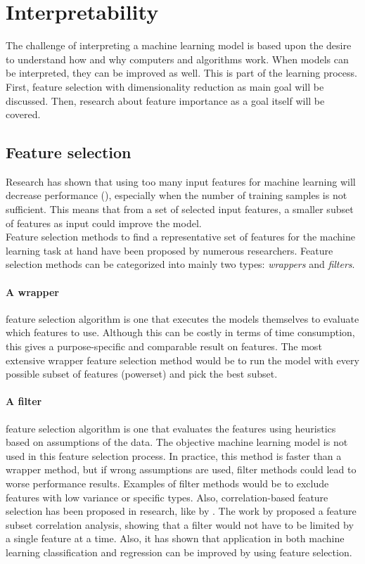 \section{Interpretability}
The challenge of interpreting a machine learning model is based upon the desire to understand how and why computers and algorithms work. When models can be interpreted, they can be improved as well. This is part of the learning process. First, feature selection with dimensionality reduction as main goal will be discussed. Then, research about feature importance as a goal itself will be covered.

\subsection{Feature selection}
Research has shown that using too many input features for machine learning will decrease performance (\cite{Trunk1979-sq}), especially when the number of training samples is not sufficient. This means that from a set of selected input features, a smaller subset of features as input could improve the model. 
\\Feature selection methods to find a representative set of features for the machine learning task at hand have been proposed by numerous researchers. Feature selection methods can be categorized into mainly two types: \textit{wrappers} and \textit{filters}. 
\paragraph{A wrapper} feature selection algorithm is one that executes the models themselves to evaluate which features to use. Although this can be costly in terms of time consumption, this gives a purpose-specific and comparable result on features. The most extensive wrapper feature selection method would be to run the model with every possible subset of features (powerset) and pick the best subset.

\paragraph{A filter} feature selection algorithm is one that evaluates the features using heuristics based on assumptions of the data. The objective machine learning model is not used in this feature selection process. In practice, this method is faster than a wrapper method, but if wrong assumptions are used, filter methods could lead to worse performance results. Examples of filter methods would be to exclude features with low variance or specific types. Also, correlation-based feature selection has been proposed in research, like by \cite{Hall2000-bx}. The work by \cite{Hall2000-bx} proposed a feature subset correlation analysis, showing that a filter would not have to be limited by a single feature at a time. Also, it has shown that application in both machine learning classification and regression can be improved by using feature selection.

